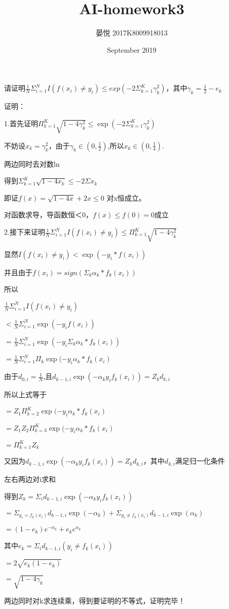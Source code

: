 \documentclass{ctexart}
\title{AI-homework3}
\author{晏悦 2017K8009918013}
\date{September 2019}
\begin{document}
\maketitle

请证明$\frac{1}{N}\Sigma_{i=1}^N I(f(x_i) \not= y_i) \leq exp(-2\Sigma_{k=1}^K\gamma_k^2)$，其中$\gamma_k=\frac{1}{2}-e_k$

证明：

1.首先证明$\Pi_{k=1}^K\sqrt{1-4\gamma_k^2}\leq \exp(-2\Sigma_{k=1}^K \gamma_k^2)$

不妨设$x_k = \gamma_k^2$，由于$\gamma_k\in(0,\frac{1}{2})$,所以$x_k\in(0,\frac{1}{4})$.

两边同时去对数ln

得到$\Sigma_{k=1}^K \sqrt{1-4x_k} \leq -2\Sigma x_k$

即证$f(x) = \sqrt{1-4x}+2x \leq 0$ 对x恒成立。

对函数求导，导函数恒＜0，$f(x)\leq f(0) = 0$成立



2.接下来证明$\frac{1}{N}\Sigma_{i=1}^N I(f(x_i) \not= y_i) \leq \Pi_{k=1}^K\sqrt{1-4\gamma_k^2}$

显然$I(f(x_i)\not=y_i) < \exp(-y_i*f(x_i))$

并且由于$f(x_i)=sign(\Sigma_k\alpha_k*f_k(x_i))$

所以

$\frac{1}{N} \Sigma_{i=1}^N I(f(x_i) \not= y_i)$ 

$<\frac{1}{N}  \Sigma_{i=1}^N  \exp(-y_i f(x_i))$

$=\frac{1}{N}\Sigma_{i=1}^N \exp(-y_i \Sigma_k\alpha_k*f_k(x_i))$

$=\frac{1}{N}\Sigma_{i=1}^N \Pi_k\exp(-y_i \alpha_k*f_k(x_i)$

由于$d_{0,i} = \frac{1}{N}$,且$d_{k-1,i} \exp(-\alpha_k y_i f_k(x_i))= Z_k d_{k,i}$

所以上式等于

$=Z_1 \Pi_{k=2}^K \exp(-y_i \alpha_k*f_k(x_i)$

$=Z_1 Z_2 \Pi_{k=3}^K \exp(-y_i \alpha_k*f_k(x_i)$

$=\Pi_{k=1}^K Z_k$

又因为$d_{k-1,i} \exp(-\alpha_k y_i f_k(x_i))= Z_k d_{k,i}$，其中$d_{k,i}$满足归一化条件

左右两边对i求和

得到$Z_k = \Sigma_id_{k-1,i} \exp(-\alpha_k y_i f_k(x_i))$

$=\Sigma_{y_i = f_k(x_i)} d_{k-1,i} \exp(-\alpha_k ) + \Sigma_{y_i \not= f_k(x_i)} d_{k-1,i} \exp(\alpha_k)$

$=(1-e_k) e^{-\alpha_k} + e_k e^{\alpha_k}$

其中$e_k = \Sigma_i d_{k-1,i} (y_i \not= f_k(x_i))$

$=2\sqrt{e_k(1-e_k)}$

$=\sqrt{1-4\gamma_k}$

两边同时对k求连续乘，得到要证明的不等式，证明完毕！
\end{document}
